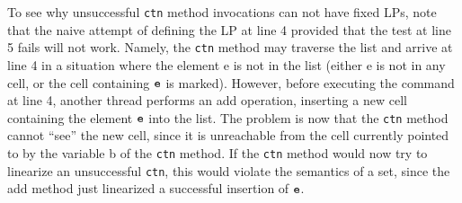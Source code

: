 To see why unsuccessful {\tt ctn} method invocations can not have fixed LPs, note
that the naive attempt of defining the LP at line 4 provided that the test at line 5 fails
will not work. Namely, the {\tt ctn} method may traverse the list and arrive at line 4 in a
situation where the element e is not in the list (either e is not in any cell, or the cell
containing $\tt e$ is marked). However, before executing the command at line 4, another
thread performs an add operation, inserting a new cell containing the element $\tt e$ into
the list. The problem is now that the {\tt ctn} method cannot “see” the new cell, since it is
unreachable from the cell currently pointed to by the variable b of the {\tt ctn} method. If
the {\tt ctn} method would now try to linearize an unsuccessful {\tt ctn}, this would violate
the semantics of a set, since the add method just linearized a successful insertion of $\tt e$.
%


